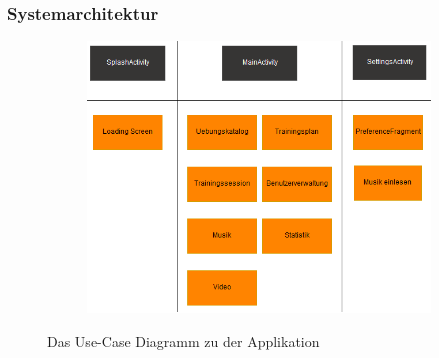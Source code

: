 \documentclass[FIPLY_base.tex]{subfiles}
\begin{document}
	\subsubsection{Systemarchitektur}
	\begin{figure}[H]
		\begin{subfigure}[b]{0.3\textwidth}
			\centering
			\includegraphics[scale=0.6]{img/Systemarchitektur}
		\end{subfigure}
		\caption{Das Use-Case Diagramm zu der Applikation}
	\end{figure}
\end{document}
